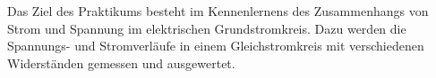 Das Ziel des Praktikums besteht im Kennenlernens des Zusammenhangs von Strom und Spannung im elektrischen Grundstromkreis. Dazu werden die Spannungs- und Stromverläufe in einem Gleichstromkreis mit verschiedenen Widerständen gemessen und ausgewertet.